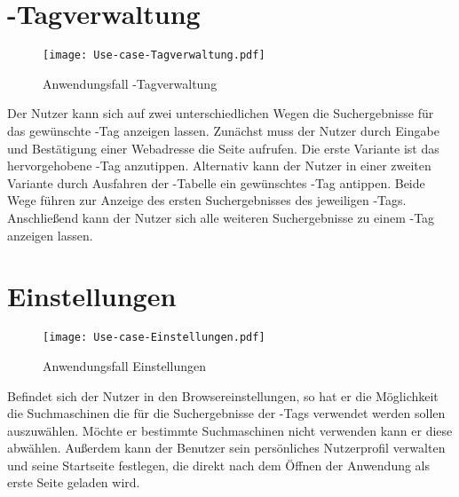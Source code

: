 \section{\SEARCH-Tagverwaltung}
\begin{figure}[htb]
\centering
\texttt{[image: Use-case-Tagverwaltung.pdf]}
	\caption{Anwendungsfall \glqq \SEARCH-Tagverwaltung\grqq}
\end{figure}
Der Nutzer kann sich auf zwei unterschiedlichen Wegen die Suchergebnisse für das gewünschte \SEARCH-Tag anzeigen lassen. Zunächst muss der Nutzer durch Eingabe und Bestätigung einer Webadresse die Seite aufrufen. Die erste Variante ist das hervorgehobene \SEARCH-Tag anzutippen. Alternativ kann der Nutzer in einer zweiten Variante durch Ausfahren der \SEARCH-Tabelle ein gewünschtes \SEARCH-Tag antippen. Beide Wege führen zur Anzeige des ersten Suchergebnisses des jeweiligen \SEARCH-Tags. Anschließend kann der Nutzer sich alle weiteren Suchergebnisse zu einem \SEARCH-Tag anzeigen lassen.
\newpage
\section{Einstellungen}
\begin{figure}[htb]
\centering
\texttt{[image: Use-case-Einstellungen.pdf]} %
	\caption{Anwendungsfall \glqq Einstellungen\grqq\xspace}
\end{figure}
Befindet sich der Nutzer in den Browsereinstellungen, so hat er die Möglichkeit die Suchmaschinen die für die Suchergebnisse der \SEARCH-Tags verwendet werden sollen auszuwählen. Möchte er bestimmte Suchmaschinen nicht verwenden kann er diese abwählen. Außerdem kann der Benutzer sein persönliches Nutzerprofil verwalten und seine Startseite festlegen, die direkt nach dem Öffnen der Anwendung als erste Seite geladen wird.
